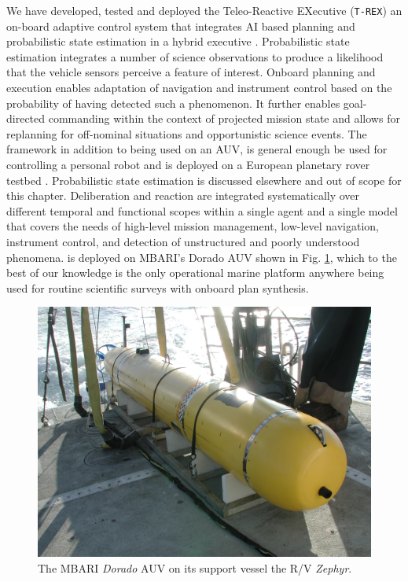 We have developed, tested and deployed the Teleo-Reactive EXecutive
(\texttt{T-REX}) an on-board adaptive control system that integrates
AI based planning and probabilistic state estimation in a hybrid
executive \cite{mcgann08a,mcgann08b,Py10}.  Probabilistic state
estimation integrates a number of science observations to produce a
likelihood that the vehicle sensors perceive a feature of
interest. Onboard planning and execution enables adaptation of
navigation and instrument control based on the probability of having
detected such a phenomenon. It further enables goal-directed
commanding within the context of projected mission state and allows
for replanning for off-nominal situations and opportunistic science
events. The framework in addition to being used on an AUV, is general
enough be used for controlling a personal robot \cite{mcgann2009} and
is deployed on a European planetary rover testbed
\cite{goac11}. Probabilistic state estimation is discussed elsewhere
\cite{mcgann08d} and out of scope for this chapter. Deliberation and
reaction are integrated systematically over different temporal and
functional scopes within a single agent and a single model that covers
the needs of high-level mission management, low-level navigation,
instrument control, and detection of unstructured and poorly
understood phenomena. \rx is deployed on MBARI's Dorado AUV shown in
Fig. \ref{fig:auv-fig}, which to the best of our knowledge is the only
operational marine platform anywhere being used for routine scientific
surveys with onboard plan synthesis.

\begin{figure}[t]
  \centering
  \vskip-5pt
  \includegraphics[scale=0.325]{figs/MBARI-AUV.jpg}
  \caption{\small The MBARI \emph{Dorado} AUV on its support vessel
    the R/V \emph{Zephyr}.}
  \label{fig:auv-fig}
  \vskip-0.3cm
\end{figure}
